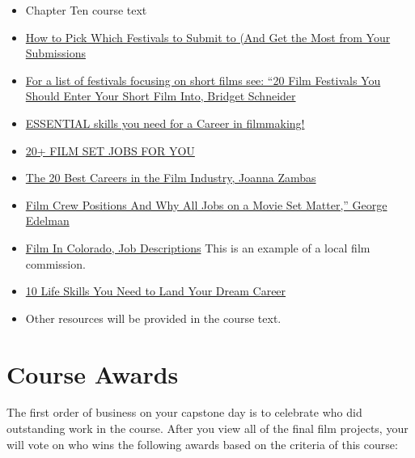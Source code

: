 \documentclass[
]{book}
\providecommand{\tightlist}{%
  \setlength{\itemsep}{0pt}\setlength{\parskip}{0pt}}
\begin{document}
\begin{itemize}
\tightlist
\item
  Chapter Ten course text\\
\item
  \href{https://medium.com/filmfreeway/how-to-pick-which-festivals-to-submit-to-5c230989c607}{How to Pick Which Festivals to Submit to (And Get the Most from Your Submissions}\\
\item
  \href{http://resourcemagonline.com/2017/11/20-film-festivals-you-should-enter-your-short-film-into/82548/}{For a list of festivals focusing on short films see: ``20 Film Festivals You Should Enter Your Short Film Into, Bridget Schneider}\\
\item
  \href{https://www.youtube.com/watch?v=1grxjdy831g}{ESSENTIAL skills you need for a Career in filmmaking!}\\
\item
  \href{https://www.youtube.com/watch?v=Tvjg1ndrPlQ}{20+ FILM SET JOBS FOR YOU}\\
\item
  \href{https://www.careeraddict.com/film-jobs}{The 20 Best Careers in the Film Industry, Joanna Zambas}\\
\item
  \href{https://nofilmschool.com/film-crew-jobs}{Film Crew Positions And Why All Jobs on a Movie Set Matter,'' George Edelman}\\
\item
  \href{https://filmincolorado.com/resources/job-descriptions/}{Film In Colorado, Job Descriptions} This is an example of a local film commission.\\
\item
  \href{https://career.noomii.com/life-skills-need-land-dream-career/}{10 Life Skills You Need to Land Your Dream Career}\\
\item
  Other resources will be provided in the course text.
\end{itemize}

\hypertarget{course-awards}{%
\section{Course Awards}\label{course-awards}}

The first order of business on your capstone day is to celebrate who did outstanding work in the course. After you view all of the final film projects, your will vote on who wins the following awards based on the criteria of this course:
\end{document}
